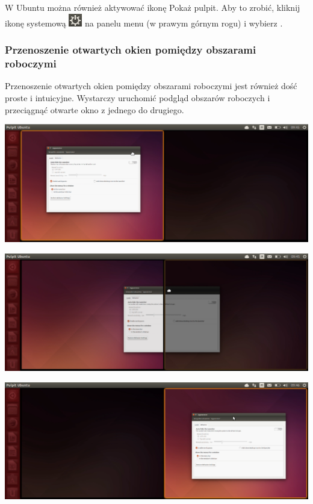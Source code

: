 W Ubuntu można również aktywować ikonę \textcolor{ubuntu_orange}{Pokaż pulpit}. Aby to zrobić, kliknij ikonę systemową \includegraphics{images/ikony_zasilanie.png} na panelu menu (w prawym górnym rogu) i wybierz .

\subsubsection{Przenoszenie otwartych okien pomiędzy obszarami roboczymi}
Przenoszenie otwartych okien pomiędzy obszarami roboczymi jest również dość proste i intuicyjne. Wystarczy uruchomić podgląd obszarów roboczych i przeciągnąć otwarte okno z jednego do drugiego.

\begin{center}
	\includegraphics[width=\linewidth]{images/unity_okno_przenoszenie1.png}
\end{center}

\begin{center}
	\includegraphics[width=\linewidth]{images/unity_okno_przenoszenie2.png}
\end{center}

\begin{center}
	\includegraphics[width=\linewidth]{images/unity_okno_przenoszenie3.png}
\end{center}

